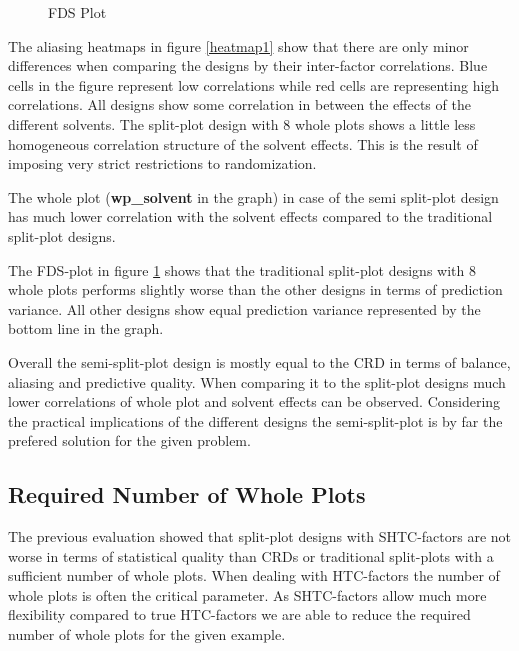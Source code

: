 \begin{figure}[!h]
	\caption{FDS Plot}
	\label{fds}
\end{figure}

\begin{figure*}[!h]
	\caption{Correlations of Factors and Whole Plots}
	\label{heatmap1}
\end{figure*}

The aliasing heatmaps in figure \ref{heatmap1} show that there are only minor differences when comparing the designs by their inter-factor correlations. Blue cells in the figure represent low correlations while red cells are representing high correlations. All designs show some correlation in between the effects of the different solvents. The split-plot design with 8 whole plots shows a little less homogeneous correlation structure of the solvent effects. This is the result of imposing very strict restrictions to randomization.

The whole plot (\textbf{wp\_solvent} in the graph) in case of the semi split-plot design has much lower correlation with the solvent effects compared to the traditional split-plot designs.

The FDS-plot in figure \ref{fds} shows that the traditional split-plot designs with 8 whole plots performs slightly worse than the other designs in terms of prediction variance. All other designs show equal prediction variance represented by the bottom line in the graph.

Overall the semi-split-plot design is mostly equal to the CRD in terms of balance, aliasing and predictive quality. When comparing it to the split-plot designs much lower correlations of whole plot and solvent effects can be observed. Considering the practical implications of the different designs the semi-split-plot is by far the prefered solution for the given problem.

\subsection{Required Number of Whole Plots}

The previous evaluation showed that split-plot designs with SHTC-factors are not worse in terms of statistical quality than CRDs or traditional split-plots with a sufficient number of whole plots. When dealing with HTC-factors the number of whole plots is often the critical parameter. As SHTC-factors allow much more flexibility compared to true HTC-factors we are able to reduce the required number of whole plots for the given example. 

